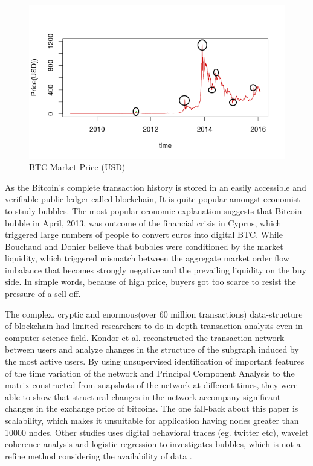 \begin{figure}[ht]
\begin{center}
\includegraphics[width=\textwidth]{./Figures/bubble.png}
\caption{BTC Market Price (USD)}
\label{fig:bubble}
\end{center}
\end{figure}

 As the Bitcoin's complete transaction history is stored in an easily accessible and verifiable public ledger called blockchain, It is quite popular amongst economist to study bubbles. The most popular economic explanation \citep{Lo2015, Kristoufek2015} suggests that Bitcoin bubble in April, 2013, was outcome of the financial crisis in Cyprus, which triggered large numbers of people to convert euros into digital BTC. While Bouchaud  and Donier \citep{Donier2015} believe that bubbles were conditioned by the market liquidity, which triggered mismatch between the aggregate market order flow imbalance that becomes strongly negative and the prevailing liquidity on the buy side. In simple words, because of high price, buyers got too scarce to resist the pressure of a sell-off.
 
The complex, cryptic and enormous(over 60 million transactions) data-structure of blockchain had limited researchers to do in-depth transaction analysis even in computer science field. Kondor et al. \citep{Kondor2014} reconstructed the transaction network between users and analyze changes in the structure of the subgraph induced by the most active users. By using unsupervised identification of important features of the time variation of the network and Principal Component Analysis to the matrix constructed from snapshots of the network at different times, they were able to show that structural changes in the network accompany significant changes in the exchange price of bitcoins. The one fall-back about this paper is scalability, which makes it unsuitable for application having nodes greater than 10000 nodes. Other studies \citep{Kristoufek2015} uses digital behavioral traces (eg. twitter etc), wavelet coherence analysis and logistic regression to investigates bubbles, which is not a refine method considering the availability of data \citep{Ali2014}.

